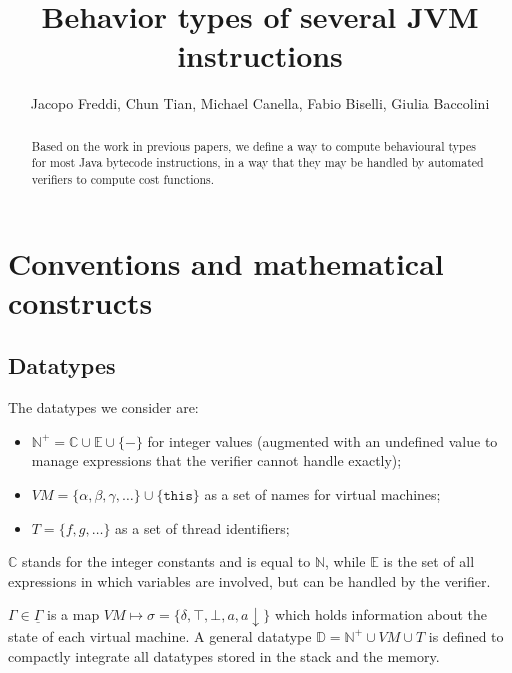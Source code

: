 \documentclass{amsart}
\newcommand{\N}{\mathbb{N}}
\newcommand{\E}{\mathbb{E}}
\newcommand{\C}{\mathbb{C}}
\newcommand{\data}{\mathbb{D}}
\newcommand{\down}[1]{#1\downarrow}
\newcommand{\Int}{\N^+}
\newcommand{\Gset}{\underline{\Gamma}}
\numberwithin{equation}{section}
\theoremstyle{plain} %
\theoremstyle{definition}
\theoremstyle{remark}
\begin{document}
\title{Behavior types of several JVM instructions}
\author{Jacopo Freddi, Chun Tian, Michael Canella, Fabio Biselli, Giulia Baccolini}




\maketitle

\begin{abstract}
Based on the work in previous papers, we define a way to compute behavioural types for most Java bytecode instructions, in a way that they may be handled by automated verifiers to compute cost functions.

\end{abstract}


\section{Conventions and mathematical constructs}


\subsection{Datatypes}
The datatypes we consider are:
\begin{itemize}
\item $\Int{} = \C{} \cup \E{} \cup \{-\}$ for integer values (augmented with an undefined value to manage expressions that the verifier cannot handle exactly);
\item $VM = \{\alpha, \beta, \gamma, \dots\} \cup \{\texttt{this}\}$ as a set of names for virtual machines;
\item $T = \{f, g, \dots\}$ as a set of thread identifiers;
\end{itemize}
$\C{}$ stands for the integer constants and is equal to $\N{}$, while $\E{}$ is the set of all expressions in which variables are involved, but can be handled by the verifier.

$\Gamma \in \Gset{}$ is a map $VM \mapsto \sigma = \{\delta, \top, \bot, a, \down{a}\}$ which holds information about the state of each virtual machine.
A general datatype $\data{} = \Int{} \cup VM \cup T$ is defined to compactly integrate all datatypes stored in the stack and the memory.
\end{document}
